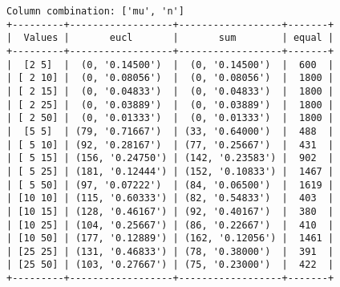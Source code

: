 \documentclass{article}
\begin{document}
\begin{verbatim}
Column combination: ['mu', 'n']
+---------+------------------+------------------+-------+
|  Values |       eucl       |       sum        | equal |
+---------+------------------+------------------+-------+
|  [2 5]  |  (0, '0.14500')  |  (0, '0.14500')  |  600  |
| [ 2 10] |  (0, '0.08056')  |  (0, '0.08056')  |  1800 |
| [ 2 15] |  (0, '0.04833')  |  (0, '0.04833')  |  1800 |
| [ 2 25] |  (0, '0.03889')  |  (0, '0.03889')  |  1800 |
| [ 2 50] |  (0, '0.01333')  |  (0, '0.01333')  |  1800 |
|  [5 5]  | (79, '0.71667')  | (33, '0.64000')  |  488  |
| [ 5 10] | (92, '0.28167')  | (77, '0.25667')  |  431  |
| [ 5 15] | (156, '0.24750') | (142, '0.23583') |  902  |
| [ 5 25] | (181, '0.12444') | (152, '0.10833') |  1467 |
| [ 5 50] | (97, '0.07222')  | (84, '0.06500')  |  1619 |
| [10 10] | (115, '0.60333') | (82, '0.54833')  |  403  |
| [10 15] | (128, '0.46167') | (92, '0.40167')  |  380  |
| [10 25] | (104, '0.25667') | (86, '0.22667')  |  410  |
| [10 50] | (177, '0.12889') | (162, '0.12056') |  1461 |
| [25 25] | (131, '0.46833') | (78, '0.38000')  |  391  |
| [25 50] | (103, '0.27667') | (75, '0.23000')  |  422  |
+---------+------------------+------------------+-------+
\end{verbatim}
\end{document}
